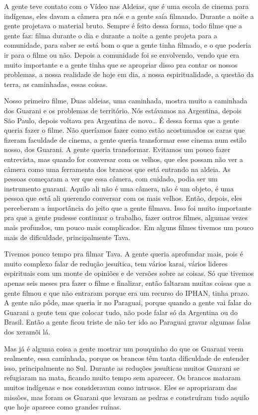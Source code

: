 A gente teve contato com o Vídeo nas Aldeias, que é uma escola de cinema
para indígenas, eles davam a câmera pra nós e a gente saía filmando.
Durante a noite a gente projetava o material bruto. Sempre é feito
dessa forma, todo filme que a gente faz: filma durante o dia e durante
a noite a gente projeta para a comunidade, para saber se está bom o que
a gente tinha filmado, e o que poderia ir para o filme ou não. Depois a
comunidade foi se envolvendo, vendo que era muito importante e a gente
tinha que se apropriar disso pra contar os nossos problemas, a nossa
realidade de hoje em dia, a nossa espiritualidade, a questão da terra,
as caminhadas, essas coisas. 

Nosso primeiro filme, Duas aldeias, uma caminhada, mostra muito a
caminhada dos Guarani e os problemas de território. Nós estávamos na
Argentina, depois São Paulo, depois voltava pra Argentina de novo\ldots{} É
dessa forma que a gente queria fazer o filme. Não queríamos fazer como
estão acostumados os caras que fizeram faculdade de cinema, a gente
queria transformar esse cinema num estilo nosso, dos Guarani. A gente
queria transformar. Evitamos um pouco fazer entrevista, mas quando for
conversar com os velhos, que eles possam não ver a câmera como uma
ferramenta dos brancos que está entrando na aldeia. As pessoas
começaram a ver que essa câmera, com cuidado, podia ser um instrumento
guarani. Aquilo ali não é uma câmera, não é um objeto, é uma pessoa que
está ali querendo conversar com os mais velhos. Então, depois, eles
perceberam a importância do jeito que a gente filmava. Isso foi muito
importante pra que a gente pudesse continuar o trabalho, fazer outros
filmes, algumas vezes mais profundos, um pouco mais complicados. Em
alguns filmes tivemos um pouco mais de dificuldade, principalmente
Tava.  

Tivemos pouco tempo pra filmar Tava. A gente queria aprofundar mais,
pois é muito complexo falar de redução jesuítica, tem vários karai,
vários lideres espirituais com um monte de opiniões e de versões sobre
as coisas. Só que tivemos apenas seis meses pra fazer o filme e
finalizar, então faltaram muitas coisas que a gente filmou e que não
entraram porque era um recurso do IPHAN, tinha prazo. A gente não pôde,
mas queria ir no Paraguai, porque quando a gente vai falar do Guarani a
gente tem que colocar tudo, não pode falar só da Argentina ou do
Brasil. Então a gente ficou triste de não ter ido ao Paraguai gravar
algumas falas dos xeramõi lá. 

Mas já é alguma coisa a gente mostrar um pouquinho do que os Guarani
veem realmente, essa caminhada, porque os brancos têm tanta dificuldade
de entender isso, principalmente no Sul. Durante as reduções jesuíticas
muitos Guarani se refugiaram na mata, ficando muito tempo sem
aparecer. Os brancos mataram muitos indígenas e nos consideravam como
intrusos. Eles se apropriaram das missões, mas foram os Guarani que
levaram as pedras e construíram tudo aquilo que hoje aparece como
grandes ruínas.

